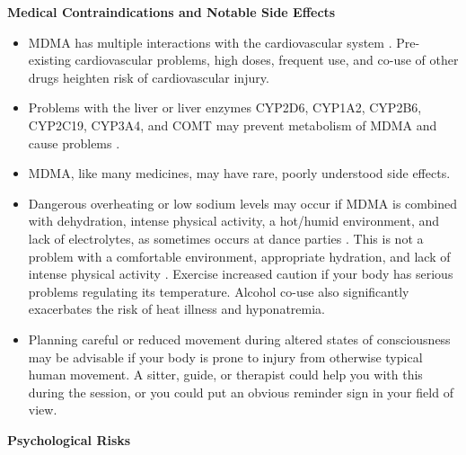 \documentclass[12pt,letterpaper]{article}
\begin{document}
\noindent \textbf{Medical Contraindications and Notable Side Effects}
\begin{itemize}
    \item MDMA has multiple interactions with the cardiovascular system \cite{bonsignoreCardio}. Pre-existing cardiovascular problems, high doses, frequent use, and co-use of other drugs heighten risk of cardiovascular injury. 
    \item Problems with the liver or liver enzymes CYP2D6, CYP1A2, CYP2B6, CYP2C19, CYP3A4, and COMT may prevent metabolism of MDMA and cause problems \cite{torreEnzymes}.
    \item MDMA, like many medicines, may have rare, poorly understood side effects. 
    \item Dangerous overheating or low sodium levels may occur if MDMA is combined with dehydration, intense physical activity, a hot/humid environment, and lack of electrolytes, as sometimes occurs at dance parties \cite{vanOverheatingAlcohol}. This is not a problem with a comfortable environment, appropriate hydration, and lack of intense physical activity \cite{mitchellMDMAClinicalTrial}. Exercise increased caution if your body has serious problems regulating its temperature. Alcohol co-use also significantly exacerbates the risk of heat illness and hyponatremia.
    \item Planning careful or reduced movement during altered states of consciousness may be advisable if your body is prone to injury from otherwise typical human movement. A sitter, guide, or therapist could help you with this during the session, or you could put an obvious reminder sign in your field of view. 
\end{itemize}
\noindent \textbf{Psychological Risks}
\end{document}
